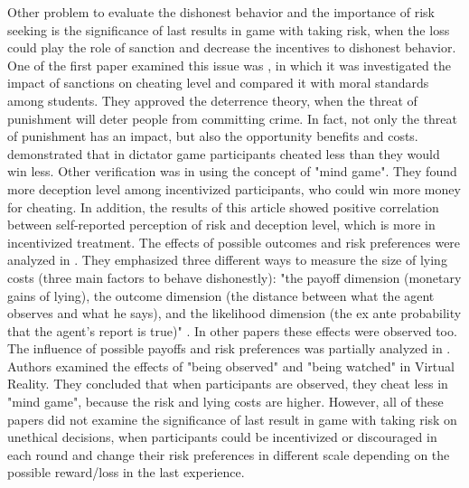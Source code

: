 \documentclass[12pt]{article}
\begin{document}
	 Other problem to evaluate the dishonest behavior and the importance of risk seeking is the significance of last results in game with taking risk, when the loss could play the role of sanction and decrease the incentives to dishonest behavior. One of the first paper examined this issue was \cite{tittle1973moral}, in which it was investigated the impact of sanctions on cheating level and compared it with moral standards among students. They approved the deterrence theory, when the threat of punishment will deter people from committing crime. In fact, not only the threat of punishment has an impact, but also the opportunity benefits and costs. \cite{gneezy2005deception} demonstrated that in dictator game participants cheated less than they would win less. Other verification was in \cite{zimerman2014self} using the concept of "mind game". They found more deception level among incentivized participants, who could win more money for cheating. In addition, the results of this article showed positive correlation between self-reported perception of risk and deception level, which is more in incentivized treatment. The effects of possible outcomes and risk preferences were analyzed in \cite{gneezy2018lying}. They emphasized three different ways to measure the size of lying costs (three main factors to behave dishonestly): "the payoff dimension (monetary gains of lying), the outcome dimension (the distance between what the agent observes and what he says), and the likelihood dimension (the ex ante probability that the agent’s report is true)" \autocite{gneezy2018lying}. In other papers these effects were observed too. The influence of possible payoffs and risk preferences was partially analyzed in \cite{mol2020not}. Authors examined the effects of "being observed" and "being watched" in Virtual Reality. They concluded that when participants are observed, they cheat less in "mind game", because the risk and lying costs are higher. However, all of these papers did not examine the significance of last result in game with taking risk on unethical decisions, when participants could be incentivized or discouraged in each round and change their risk preferences in different scale depending on the possible reward/loss in the last experience.
	 
\end{document}
